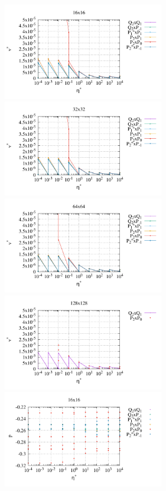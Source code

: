\begin{center}
\includegraphics[width=7cm]{python_codes/fieldstone_120/paperresults/sinker/structured/sinker_vel_16}
\includegraphics[width=7cm]{python_codes/fieldstone_120/paperresults/sinker/structured/sinker_vel_32}\\
\includegraphics[width=7cm]{python_codes/fieldstone_120/paperresults/sinker/structured/sinker_vel_64}
\includegraphics[width=7cm]{python_codes/fieldstone_120/paperresults/sinker/structured/sinker_vel_128}\\
\includegraphics[width=7cm]{python_codes/fieldstone_120/paperresults/sinker/structured/sinker_press_16}

\end{center}
